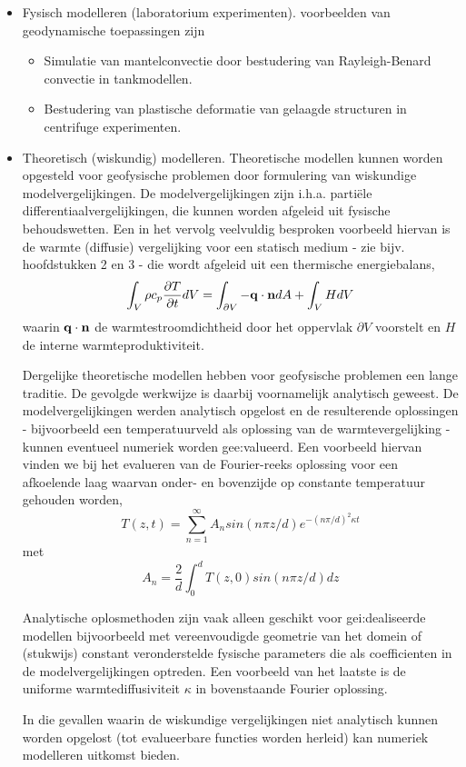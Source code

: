 \begin{itemize}

\item Fysisch modelleren (laboratorium experimenten).
voorbeelden van geodynamische toepassingen zijn
\begin{itemize}
\item Simulatie van mantelconvectie door bestudering van Rayleigh-Benard
convectie in tankmodellen.
\item Bestudering van plastische deformatie van gelaagde structuren in
centrifuge experimenten.
\end{itemize}

\item Theoretisch (wiskundig) modelleren.
Theoretische modellen kunnen worden opgesteld voor geofysische
problemen door formulering van wiskundige modelvergelijkingen.
De modelvergelijkingen zijn i.h.a. parti\"{e}le 
differentiaalvergelijkingen, die kunnen worden afgeleid uit fysische
behoudswetten.
Een in het vervolg veelvuldig besproken voorbeeld hiervan is de 
warmte (diffusie) vergelijking voor een statisch medium 
- zie bijv. hoofdstukken 2 en 3 -
die wordt afgeleid uit een thermische energiebalans,
$$
\int_V \rho c_p \frac{\partial T}{\partial t} dV =
\int_{\partial V} - {\bf q} \cdot {\bf n} dA +
\int_V H dV
$$
waarin ${\bf q} \cdot {\bf n}$ de warmtestroomdichtheid door het
oppervlak $\partial V$ voorstelt en $H$ de interne warmteproduktiviteit.

Dergelijke theoretische modellen hebben voor geofysische
problemen een lange traditie.
De gevolgde werkwijze is daarbij voornamelijk analytisch
geweest.
De modelvergelijkingen werden analytisch opgelost en de
resulterende oplossingen - bijvoorbeeld een temperatuurveld
als oplossing van de warmtevergelijking - kunnen eventueel numeriek
worden gee\*:valueerd.
Een voorbeeld hiervan vinden we bij het evalueren van de
Fourier-reeks oplossing voor een afkoelende laag waarvan 
onder- en bovenzijde op constante temperatuur gehouden worden,
$$
T(z,t) = \sum_{n=1}^{\infty} 
A_n sin ( n \pi z/d )
e^{- (n \pi /d)^2 \kappa t}
$$
met
$$
A_n = \frac{2}{d}
\int_0^d T(z,0) sin ( n \pi z/d ) dz
$$

Analytische oplosmethoden zijn vaak alleen geschikt voor gei\*:dealiseerde
modellen bijvoorbeeld met vereenvoudigde geometrie van het domein
of (stukwijs) constant veronderstelde fysische parameters die als
coefficienten in de modelvergelijkingen optreden.
Een voorbeeld van het laatste is de uniforme warmtediffusiviteit
$\kappa$ in bovenstaande Fourier oplossing.

In die gevallen waarin de wiskundige vergelijkingen niet analytisch
kunnen worden opgelost (tot evalueerbare functies worden herleid)
kan numeriek modelleren uitkomst bieden.
\end{itemize}

